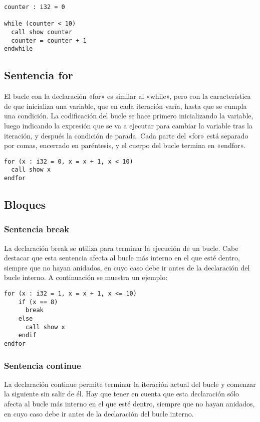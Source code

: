 \begin{verbatim}
counter : i32 = 0

while (counter < 10)
  call show counter
  counter = counter + 1
endwhile
\end{verbatim}

\subsection{Sentencia for}
El bucle con la declaración «for» es similar al «while», pero con la característica de que
inicializa una variable, que en cada iteración varía, hasta que se cumpla una condición.
La codificación del bucle se hace primero inicializando la variable, luego indicando la
expresión que se va a ejecutar para cambiar la variable tras la iteración, y después la
condición de parada. Cada parte del «for» está separado por comas, encerrado en paréntesis,
y el cuerpo del bucle termina en «endfor».

\begin{verbatim}
for (x : i32 = 0, x = x + 1, x < 10)
  call show x
endfor
\end{verbatim}

\subsection{Bloques}
\subsubsection{Sentencia break}

La declaración break se utiliza para terminar la ejecución de un bucle.
Cabe destacar que esta sentencia afecta al bucle más interno en el que esté dentro,
siempre que no hayan anidados, en cuyo caso debe ir antes de la declaración
del bucle interno.
A continuación se muestra un ejemplo:

\begin{verbatim}
for (x : i32 = 1, x = x + 1, x <= 10)
    if (x == 8)
      break
    else
      call show x
    endif
endfor
\end{verbatim}

\subsubsection{Sentencia continue}

La declaración continue permite terminar la iteración actual del bucle y
comenzar la siguiente sin salir de él. Hay que tener en cuenta que esta
declaración sólo afecta al bucle más interno en el que esté dentro,
siempre que no hayan anidados, en cuyo caso debe ir antes de la declaración
del bucle interno.

